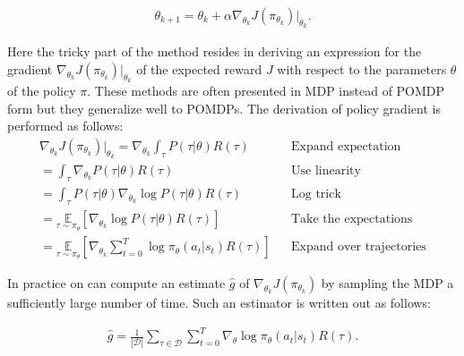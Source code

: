 \begin{align*}
    \theta_{k+1} = \theta_k + \alpha \nabla_{\theta_k} J(\pi_{\theta_k}) \vert_{\theta_k}.
\end{align*}

Here the tricky part of the method resides in deriving an expression for the gradient $\nabla_{\theta_k} J(\pi_{\theta_k}) \vert_{\theta_k}$ of the expected reward $J$ with respect to the parameters $\theta$ of the policy $\pi$. These methods are often presented in MDP instead of POMDP form but they generalize well to POMDPs. The derivation of policy gradient is performed as follows:
\begin{align*}
    \nabla_{\theta_k} J(\pi_{\theta_k}) \vert_{\theta_k} 
    =  \nabla_{\theta_k} \int_\tau P(\tau|\theta)R(\tau)
    && \text{Expand expectation}\\
    =  \int_\tau \nabla_{\theta_k}  P(\tau|\theta)R(\tau)
    && \text{Use linearity}\\
    =  \int_\tau  P(\tau|\theta) \nabla_{\theta_k} \log P(\tau|\theta)R(\tau)
    && \text{Log trick} \\
    =  \underset{\tau \sim \pi_\theta}{\mathbb{E}} \left[\nabla_{\theta_k} \log P(\tau|\theta)R(\tau)\right]
    && \text{Take the expectations}\\
    =  \underset{\tau \sim \pi_\theta}{\mathbb{E}} \left[\nabla_{\theta_k} \sum_{t=0}^T \log \pi_\theta(a_t|s_t)R(\tau)\right]
    && \text{Expand over trajectories}
\end{align*}

In practice on can compute an estimate $\hat{g}$ of $\nabla_{\theta_k} J(\pi_{\theta_k})$ by sampling the MDP a sufficiently large number of time. Such an estimator is written out as follows: 

\begin{align*}
    \hat{g} = \frac{1}{|\mathcal{D}|} \sum_{\tau \in \mathcal{D}} \sum_{t=0}^{T} \nabla_\theta \log \pi_\theta (a_t|s_t) R(\tau).
\end{align*}


